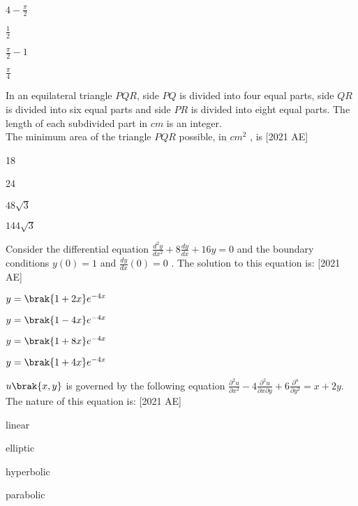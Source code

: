 \begin{enumerate}
    \begin{multicols}{2}
        \item $4 - \frac{\pi}{2}$
        \item $\frac{1}{2}$
        \item $\frac{\pi}{2} - 1$
        \item $\frac{\pi}{4}$
    \end{multicols}
\end{enumerate}
\item In an equilateral triangle $PQR$, side $PQ$ is divided into four equal parts, side
$QR$ is divided into six equal parts and side $PR$ is divided into eight equal parts.
The length of each subdivided part in $cm$ is an integer. \\
The minimum area of the triangle $PQR$ possible, in $cm^2$
, is \hfill[2021 AE]
\begin{enumerate}
    \begin{multicols}{4}
        \item 18
        \item 24
        \item $48\sqrt{3}$
        \item $144\sqrt{3}$
    \end{multicols}
\end{enumerate}
\item Consider the differential equation $\frac{d^2y}{dx^2} + 8 \frac{dy}{dx} + 16y = 0$
and the boundary
conditions
$y(0) = 1$
and $\frac{dy}{dx}
(0) = 0$ 
. The solution to this equation is: \hfill [2021 AE]
\begin{enumerate}
\begin{multicols}{2}
\item $y = \brak{1 + 2x}e^{-4x}$
    \item $y = \brak{1 - 4x}e^{-4x}$
   \item $y = \brak{1 + 8x}e^{-4x}$
     \item $y = \brak{1 + 4x}e^{-4x}$
\end{multicols}
    \end{enumerate}
    \item $u \brak{x,y}$ is governed by the following equation $\frac{\partial^2 u}{\partial x^2} -4 \frac{\partial^2 u}{\partial x \partial y} + 6 \frac{\partial^ u}{\partial y^2} = x + 2y
$. The nature of this equation is: \hfill [2021 AE]
\begin{enumerate}
\begin{multicols}{2}
    \item linear
    \item elliptic
    \item hyperbolic
\item parabolic
\end{multicols}
\end{enumerate}
